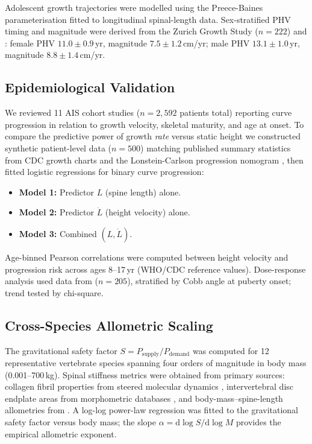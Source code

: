 \documentclass[12pt, letterpaper]{article}
\begin{document}
Adolescent growth trajectories were modelled using the Preece-Baines
parameterisation fitted to longitudinal spinal-length data. Sex-stratified PHV
timing and magnitude were derived from the Zurich Growth Study ($n=222$)
\citep{Tanner1966} and \citet{Sanders2007}: female PHV $11.0 \pm 0.9$\,yr,
magnitude $7.5 \pm 1.2$\,cm/yr; male PHV $13.1 \pm 1.0$\,yr, magnitude
$8.8 \pm 1.4$\,cm/yr.

\subsection{Epidemiological Validation}

We reviewed 11 AIS cohort studies ($n = 2{,}592$ patients total) reporting curve
progression in relation to growth velocity, skeletal maturity, and age at
onset. To compare the predictive power of growth \emph{rate} versus static
height we constructed synthetic patient-level data ($n=500$) matching published
summary statistics from CDC growth charts and the Lonstein-Carlson progression
nomogram \citep{Lonstein1982}, then fitted logistic regressions for binary curve
progression:

\begin{itemize}
  \item \textbf{Model 1:} Predictor $L$ (spine length) alone.
  \item \textbf{Model 2:} Predictor $\dot{L}$ (height velocity) alone.
  \item \textbf{Model 3:} Combined $(L, \dot{L})$.
\end{itemize}

Age-binned Pearson correlations were computed between height velocity and
progression risk across ages 8--17\,yr (WHO/CDC reference values). Dose-response
analysis used data from \citet{Charles2006} ($n=205$), stratified by Cobb angle
at puberty onset; trend tested by chi-square.

\subsection{Cross-Species Allometric Scaling}

The gravitational safety factor $S = P_{\mathrm{supply}}/P_{\mathrm{demand}}$
was computed for 12 representative vertebrate species spanning four orders of
magnitude in body mass (0.001--700\,kg). Spinal stiffness metrics were obtained
from primary sources: collagen fibril properties from steered molecular
dynamics \citep{Buehler2006}, intervertebral disc endplate areas from
morphometric databases \citep{Panjabi1976, Gal1993}, and body-mass--spine-length
allometries from \citet{Long1997}. A log-log power-law regression was fitted to
the gravitational safety factor versus body mass; the slope
$\alpha = \mathrm{d}\log S/\mathrm{d}\log M$ provides the empirical allometric
exponent.
\end{document}

